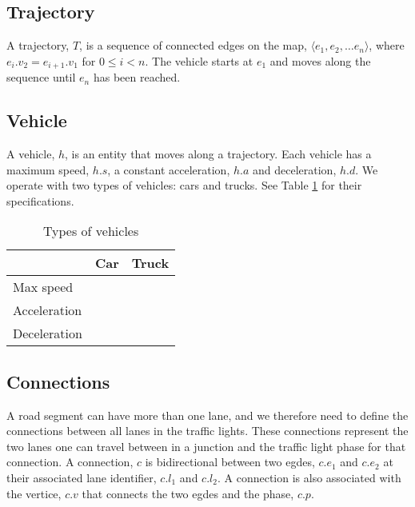 \subsection{Trajectory}
A trajectory, $T$, is a sequence of connected edges on the map, $\langle e_1, e_2, \dots e_n \rangle$, where $e_i.v_2 = e_{i+1}.v_1$ for $0\leq i< n$.
The vehicle starts at $e_1$ and moves along the sequence until $e_n$ has been reached.

\begin{comment}
A trajectory is a sequence of connected edges on the map, on which a vehicle can move. The vehicle starts at the first edge and moves along the sequence until the end of the sequence has been reached.
Let 
\[
\mathcal{T}_E = \{(e_1, e_2, \dots, e_n)\mid e_i \in E\}
\]
and be the set of all trajectories and $t\in \mathcal{T}$ be one such trajectory.
\end{comment}

\subsection{Vehicle}
A vehicle, $h$, is an entity that moves along a trajectory.
Each vehicle has a maximum speed, $h.s$, a constant acceleration, $h.a$ and deceleration, $h.d$.
We operate with two types of vehicles: cars and trucks. See Table \ref{table.vehicleTypes} for their specifications.
\begin{table}
\centering
\begin{tabular}{|l|l|l|}\hline
				& Car	& Truck \\\hline
Max speed 		& 		& \\\hline
Acceleration 	&		& \\\hline
Deceleration 	&		& \\\hline
\end{tabular}
\caption{Types of vehicles}\label{table.vehicleTypes}
\end{table}

\begin{comment}
A vehicle is an entity that moves along a trajectory. Each vehicle has a maximum speed and a constant acceleration and deceleration.
Let
\[
\mathcal{H} = \{(s, a, d)\mid s, a, d\in \mathbb{N}\}
\]
and be the set of all vehicles and $h\in \mathcal{H}$ be one such vehicle.
\end{comment}

\subsection{Connections}
A road segment can have more than one lane, and we therefore need to define the connections between all lanes in the traffic lights.
These connections represent the two lanes one can travel between in a junction and the traffic light phase for that connection.
A connection, $c$ is bidirectional between two egdes, $c.e_1$ and $c.e_2$ at their associated lane identifier, $c.l_1$ and $c.l_2$. A connection is also associated with the vertice, $c.v$ that connects the two egdes and the phase, $c.p$.

